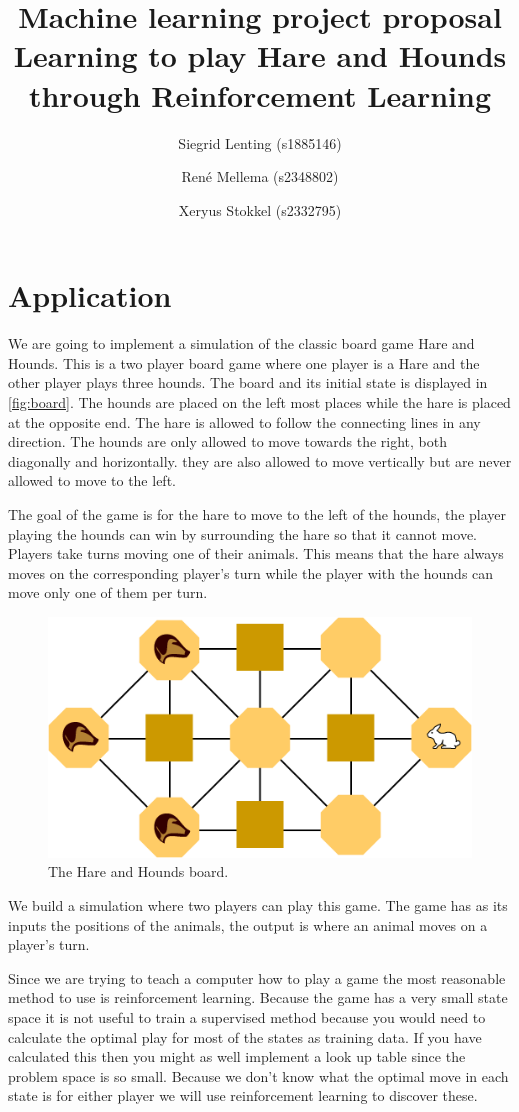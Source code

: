 \documentclass[a4paper]{article}
\title{Machine learning project proposal \\
	Learning to play Hare and Hounds through Reinforcement Learning}
\author{Siegrid Lenting (s1885146) \and Ren\'e Mellema (s2348802) \and Xeryus Stokkel (s2332795)}
\begin{document}
\maketitle

\section{Application}
We are going to implement a simulation of the classic board game Hare and
Hounds. This is a two player board game where one player is a Hare and the
other player plays three hounds. The board and its initial state is displayed
in \autoref{fig:board}. The hounds are placed on the left most places while the
hare is placed at the opposite end. The hare is allowed to follow the
connecting lines in any direction. The hounds are only allowed to move towards
the right, both diagonally and horizontally. they are also allowed to move
vertically but are never allowed to move to the left.

The goal of the game is for the hare to move to the left of the hounds, the
player playing the hounds can win by surrounding the hare so that it cannot
move. Players take turns moving one of their animals. This means that the hare
always moves on the corresponding player's turn while the player with the
hounds can move only one of them per turn.

\begin{figure}
	\centering
	\includegraphics[width=.7\textwidth]{Hare_and_Hounds_board}
	\caption{The Hare and Hounds board.}
	\label{fig:board}
\end{figure}

We build a simulation where two players can play this game. The game has as
its inputs the positions of the animals, the output is where an animal moves
on a player's turn.

Since we are trying to teach a computer how to play a game the most reasonable
method to use is reinforcement learning. Because the game has a very small
state space it is not useful to train a supervised method because you would
need to calculate the optimal play for most of the states as training data.
If you have calculated this then you might as well implement a look up table
since the problem space is so small. Because we don't know what the optimal
move in each state is for either player we will use reinforcement learning
to discover these.
\end{document}
